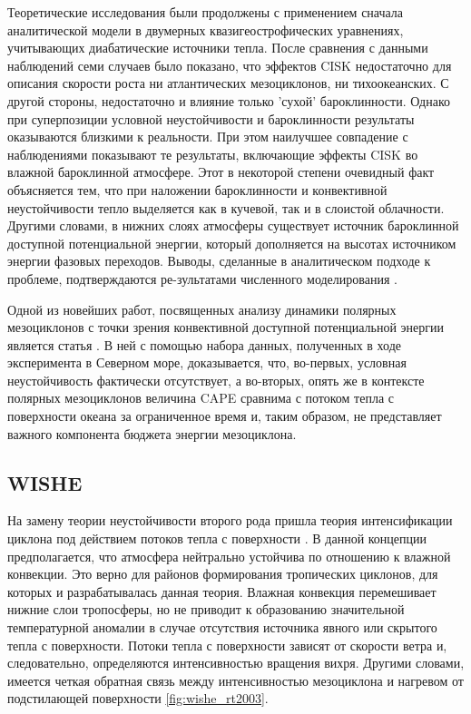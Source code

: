 Теоретические исследования были продолжены с применением сначала аналитической модели \citep{SardieWarner1983} в двумерных квазигеострофических уравнениях, учитывающих диабатические источники тепла. После сравнения с данными наблюдений семи случаев было показано, что эффектов CISK недостаточно для описания скорости роста ни атлантических мезоциклонов, ни тихоокеанских. С другой стороны, недостаточно и влияние только 'сухой' бароклинности. Однако при суперпозиции условной неустойчивости и бароклинности результаты оказываются близкими к реальности. При этом наилучшее совпадение с наблюдениями показывают те результаты, включающие эффекты CISK во влажной бароклинной атмосфере. Этот в некоторой степени очевидный факт объясняется тем, что при наложении бароклинности и конвективной неустойчивости тепло выделяется как в кучевой, так и в слоистой облачности. Другими словами, в нижних слоях атмосферы существует источник бароклинной доступной потенциальной энергии, который дополняется на высотах источником энергии фазовых переходов. Выводы, сделанные в аналитическом подходе к проблеме, подтверждаются ре-зультатами численного моделирования \citep{SardieWarner1983}.

Одной из новейших работ, посвященных анализу динамики полярных мезоциклонов с точки зрения конвективной доступной потенциальной энергии является статья \citep{LindersSaetra2010}. В ней с помощью набора данных, полученных в ходе эксперимента в Северном море, доказывается, что, во-первых, условная неустойчивость фактически отсутствует, а во-вторых, опять же в контексте полярных мезоциклонов величина CAPE сравнима с потоком тепла с поверхности океана за ограниченное время и, таким образом, не представляет важного компонента бюджета энергии мезоциклона.

\subsection{WISHE}
На замену теории неустойчивости второго рода пришла теория интенсификации циклона под действием потоков тепла с поверхности \citep{EmanuelRotunno1989}. В данной концепции предполагается, что атмосфера нейтрально устойчива по отношению к влажной конвекции. Это верно для районов формирования тропических циклонов, для которых и разрабатывалась данная теория. Влажная конвекция перемешивает нижние слои тропосферы, но не приводит к образованию значительной температурной аномалии в случае отсутствия источника явного или скрытого тепла с поверхности. Потоки тепла с поверхности зависят от скорости ветра и, следовательно, определяются интенсивностью вращения вихря. Другими словами, имеется четкая обратная связь между интенсивностью мезоциклона и нагревом от подстилающей поверхности \ref{fig:wishe_rt2003}.

